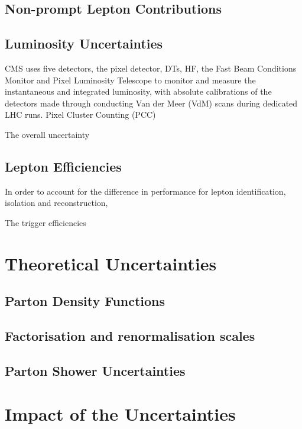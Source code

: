 \subsection{Non-prompt Lepton Contributions}

\subsection{Luminosity Uncertainties}
CMS uses five detectors, the pixel detector, DTs, HF, the Fast Beam Conditions Monitor and Pixel Luminosity Telescope to monitor and measure the instantaneous and integrated luminosity, with absolute calibrations of the detectors made through conducting Van der Meer (VdM) scans during dedicated LHC runs.
Pixel Cluster Counting (PCC) 

The overall uncertainty \cite{CMS:2017_lumi} %
\subsection{Lepton Efficiencies}
In order to account for the difference in performance for lepton identification, isolation and reconstruction, 

The trigger efficiencies 
\section{Theoretical Uncertainties}
\subsection{Parton Density Functions}

\subsection{Factorisation and renormalisation scales}
\subsection{Parton Shower Uncertainties}
\section{Impact of the Uncertainties}
